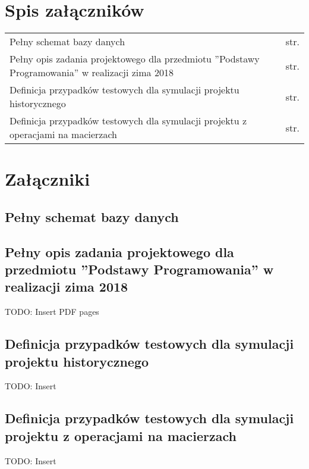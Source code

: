 \chapter*{Spis załączników}
\noindent

\begin{tabularx}{\textwidth}{Xl}

    Pełny schemat bazy danych & str. \pageref{file:database-schema} \\

    Pełny opis zadania projektowego dla przedmiotu ”Podstawy Programowania” w realizacji zima 2018 & str. \pageref{file:penguins_description} \\

    Definicja przypadków testowych dla symulacji projektu historycznego & str. \pageref{file:test_cases_penguins} \\

    Definicja przypadków testowych dla symulacji projektu z operacjami na macierzach & str. \pageref{file:test_cases_matrix} \\

\end{tabularx}

\chapter*{Załączniki}

\section*{Pełny schemat bazy danych}
\label{file:database-schema}
{
\tiny

}

\section*{Pełny opis zadania projektowego dla przedmiotu ”Podstawy Programowania” w realizacji zima 2018}
\label{file:penguins_description}

{
TODO: Insert PDF pages
}


\section*{Definicja przypadków testowych dla symulacji projektu historycznego}
\label{file:test_cases_penguins}

{
TODO: Insert
}

\section*{Definicja przypadków testowych dla symulacji projektu z operacjami na macierzach}
\label{file:test_cases_matrix}

{
TODO: Insert
}


\clearpage
